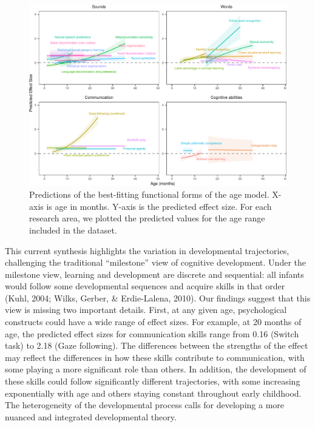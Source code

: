 \documentclass[10pt, letterpaper]{article}
\newenvironment{CodeChunk}{}{}
\begin{document}
\begin{CodeChunk}
\begin{figure}[h!]

{\centering \includegraphics{figs/2-col-imageb-1} 

}

\caption[Predictions of the best-fitting functional forms of the age model]{Predictions of the best-fitting functional forms of the age model. X-axis is age in months. Y-axis is the predicted effect size. For each research area, we plotted the predicted values for the age range included in the dataset.}\label{fig:2-col-imageb}
\end{figure}
\end{CodeChunk}

This current synthesis highlights the variation in developmental
trajectories, challenging the traditional ``milestone'' view of
cognitive development. Under the milestone view, learning and
development are discrete and sequential: all infants would follow some
developmental sequences and acquire skills in that order (Kuhl, 2004;
Wilks, Gerber, \& Erdie-Lalena, 2010). Our findings suggest that this
view is missing two important details. First, at any given age,
psychological constructs could have a wide range of effect sizes. For
example, at 20 months of age, the predicted effect sizes for
communication skills range from 0.16 (Switch task) to 2.18 (Gaze
following). The differences between the strengths of the effect may
reflect the differences in how these skills contribute to communication,
with some playing a more significant role than others. In addition, the
development of these skills could follow significantly different
trajectories, with some increasing exponentially with age and others
staying constant throughout early childhood. The heterogeneity of the
developmental process calls for developing a more nuanced and integrated
developmental theory.
\end{document}
